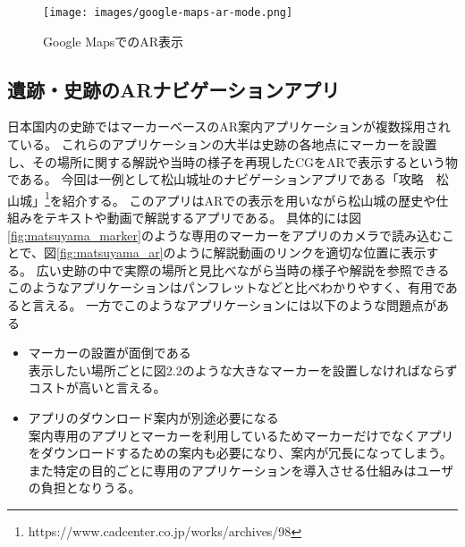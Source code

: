 \begin{figure}[H]
  \begin{center}
      \texttt{[image: images/google-maps-ar-mode.png]}
  \end{center}
  \caption{Google MapsでのAR表示} \label{fig:googleMapAr}
\end{figure}



\subsection{遺跡・史跡のARナビゲーションアプリ}
日本国内の史跡ではマーカーベースのAR案内アプリケーションが複数採用されている。
これらのアプリケーションの大半は史跡の各地点にマーカーを設置し、その場所に関する解説や当時の様子を再現したCGをARで表示するという物である。
今回は一例として松山城址のナビゲーションアプリである「攻略　松山城」\footnote{\textsf{https://www.cadcenter.co.jp/works/archives/98}}を紹介する。
このアプリはARでの表示を用いながら松山城の歴史や仕組みをテキストや動画で解説するアプリである。
具体的には図\ref{fig:matsuyama_marker}のような専用のマーカーをアプリのカメラで読み込むことで、図\ref{fig:matsuyama_ar}のように解説動画のリンクを適切な位置に表示する。
広い史跡の中で実際の場所と見比べながら当時の様子や解説を参照できるこのようなアプリケーションはパンフレットなどと比べわかりやすく、有用であると言える。
一方でこのようなアプリケーションには以下のような問題点がある

\begin{itemize}
  \item マーカーの設置が面倒である\\
    表示したい場所ごとに図2.2のような大きなマーカーを設置しなければならずコストが高いと言える。
  \item アプリのダウンロード案内が別途必要になる\\
    案内専用のアプリとマーカーを利用しているためマーカーだけでなくアプリをダウンロードするための案内も必要になり、案内が冗長になってしまう。
    また特定の目的ごとに専用のアプリケーションを導入させる仕組みはユーザの負担となりうる。
\end{itemize}

